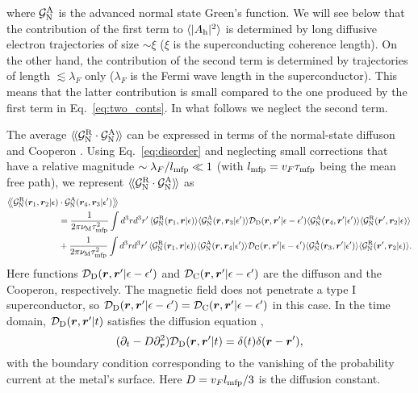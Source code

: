 \documentclass[pra,aps,a4paper,twocolumn,superscriptaddress,longbibliography]{revtex4-2}
\newcommand{\rngl}{\rangle\hspace{-0.05cm}\rangle}
\newcommand{\lngl}{\langle\hspace{-0.05cm}\langle}
\newcommand{\Rngl}{\big\rangle\hspace{-0.085cm}\big\rangle}
\newcommand{\Lngl}{\big\langle\hspace{-0.085cm}\big\langle}
\newcommand{\difz}{{\cal D}_{\rm D}}
\newcommand{\coop}{{\cal D}_{\rm C}}
\newcommand{\he}{A_{\rm h}}
\newcommand{\xic}{\xi}
\newcommand{\GR}{{\cal G}^{\rm R}_{\rm N}}
\newcommand{\GA}{{\cal G}^{\rm A}_{\rm N}}
\begin{document}
where $\GA$ is the advanced normal state Green's function. We will see below that the contribution of the first term to $\langle |\he|^2\rangle$ is determined by long diffusive electron trajectories of size $\sim \xic$ ($\xic$ is the superconducting coherence length). On the other hand, the contribution of the second term is determined by trajectories of length $\lesssim \lambda_F$ only ($\lambda_F$ is the Fermi wave length in the superconductor). This means that the latter contribution is small compared to the one produced by the first term in Eq.~\eqref{eq:two_conts}. In what follows we neglect the second term.

The average $\lngl \GR \cdot \GA\rngl$ can be expressed in terms of the normal-state diffuson and Cooperon \cite{aleiner96}. 
Using Eq.~\eqref{eq:disorder} and neglecting small corrections that have a relative magnitude $\sim \lambda_F / l_{\rm mfp} \ll 1$ (with $l_{\rm mfp} = v_F \tau_{\rm mfp}$ being the mean free path), we represent $\lngl \GR \cdot \GA\rngl$ as
\begin{align}
    \Lngl \GR({\bm r}_1,{\bm r}_2|\epsilon)&\cdot \GA({\bm r}_4, {\bm r}_3|\epsilon^\prime)\Rngl\notag\\
    &= \frac{1}{2\pi\nu_{\rm M}\tau_{\rm mfp}^{2}}\int d^3rd^3r^\prime\,\langle \GR({\bm r}_{1},{\bm r}|\epsilon)\rangle\langle \GA({\bm r},{\bm r}_{3}|\epsilon^{\prime})\rangle \difz ({\bm r},{\bm r}^\prime|\epsilon-\epsilon^{\prime})\langle \GA({\bm r}_4,{\bm r}^\prime|\epsilon^{\prime})\rangle\langle \GR({\bm r}^\prime,{\bm r}_{2}|\epsilon)\rangle\label{eq:diffuson}\\
    &+ \frac{1}{2\pi\nu_{\rm M}\tau_{\rm mfp}^{2}}\int d^3rd^3r^\prime\,\langle \GR({\bm r}_{1},{\bm r}|\epsilon)\rangle\langle \GA({\bm r},{\bm r}_{4}|\epsilon^{\prime})\rangle \coop ({\bm r},{\bm r}^\prime|\epsilon-\epsilon^{\prime})\langle \GA({\bm r}_{3},{\bm r}^\prime|\epsilon^{\prime})\rangle\langle \GR({\bm r}^\prime,{\bm r}_{2} |\epsilon)\rangle.\label{eq:cooperon}
\end{align}
Here functions ${\difz}({\bm r},{\bm r}^\prime|\epsilon-\epsilon^{\prime})$ and ${\coop}({\bm r},{\bm r}^\prime|\epsilon-\epsilon^{\prime})$ are the diffuson and the Cooperon, respectively. 
The magnetic field does not penetrate a type I superconductor, so $\difz({\bm r},{\bm r}^\prime|\epsilon-\epsilon^{\prime}) = \coop({\bm r},{\bm r}^\prime|\epsilon-\epsilon^{\prime})$ in this case. In the time domain, ${\difz}({\bm r},{\bm r}^\prime|t)$ satisfies the diffusion equation \cite{aleiner96},
\begin{equation}\label{eq:diffusion}
    (\partial_t - D \partial_{\bm r}^2) {\difz}({\bm r},{\bm r}^\prime|t) = \delta(t)\delta({\bm r} - {\bm r}^\prime),
\end{equation}
with the boundary condition corresponding to the vanishing of the probability current at the metal's surface. Here $D = v_F l_{\rm mfp} / 3$ is the diffusion constant.
\end{document}
